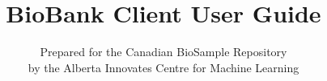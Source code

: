 \documentclass[10pt,twoside,letterpaper]{book}
\begin{document}
\frontmatter

\title{BioBank Client User Guide}
\author{\Large{Prepared for the Canadian BioSample Repository}\\
by the Alberta Innovates Centre for Machine Learning}
\maketitle
\clearpage
\tableofcontents
\clearpage
\listoffigures
\clearpage
\listoftodos
\clearpage

\mainmatter










\backmatter
\end{document}
